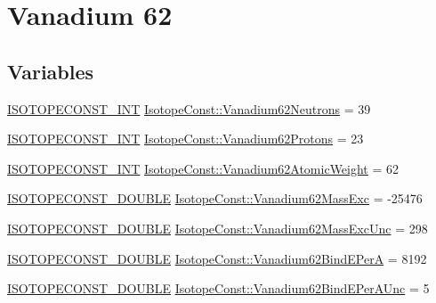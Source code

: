 \hypertarget{group___isotope_const-_vanadium-_v62}{}\section{Vanadium 62}
\label{group___isotope_const-_vanadium-_v62}
\subsection*{Variables}
\begin{DoxyCompactItemize}
\item 
\mbox{\hyperlink{group___isotope_const-_macros_ga5f18360b3e99483a35c32d789e62621c}{I\+S\+O\+T\+O\+P\+E\+C\+O\+N\+S\+T\+\_\+\+I\+NT}} \mbox{\hyperlink{group___isotope_const-_vanadium-_v62_gad43ed21a2dc1cbc2225e058b37c8a61f}{Isotope\+Const\+::\+Vanadium62\+Neutrons}} = 39
\item 
\mbox{\hyperlink{group___isotope_const-_macros_ga5f18360b3e99483a35c32d789e62621c}{I\+S\+O\+T\+O\+P\+E\+C\+O\+N\+S\+T\+\_\+\+I\+NT}} \mbox{\hyperlink{group___isotope_const-_vanadium-_v62_gae8f27ae23c41f646b58f0be22fbe4b55}{Isotope\+Const\+::\+Vanadium62\+Protons}} = 23
\item 
\mbox{\hyperlink{group___isotope_const-_macros_ga5f18360b3e99483a35c32d789e62621c}{I\+S\+O\+T\+O\+P\+E\+C\+O\+N\+S\+T\+\_\+\+I\+NT}} \mbox{\hyperlink{group___isotope_const-_vanadium-_v62_gad12f48cba044b40662072b455e52960a}{Isotope\+Const\+::\+Vanadium62\+Atomic\+Weight}} = 62
\item 
\mbox{\hyperlink{group___isotope_const-_macros_ga8f45a7272ce02c0b4c65c44636ed719a}{I\+S\+O\+T\+O\+P\+E\+C\+O\+N\+S\+T\+\_\+\+D\+O\+U\+B\+LE}} \mbox{\hyperlink{group___isotope_const-_vanadium-_v62_ga413c97d697fb0aa888dd4711de30239e}{Isotope\+Const\+::\+Vanadium62\+Mass\+Exc}} = -\/25476
\item 
\mbox{\hyperlink{group___isotope_const-_macros_ga8f45a7272ce02c0b4c65c44636ed719a}{I\+S\+O\+T\+O\+P\+E\+C\+O\+N\+S\+T\+\_\+\+D\+O\+U\+B\+LE}} \mbox{\hyperlink{group___isotope_const-_vanadium-_v62_ga6d879d455e874fb816163a0930274d02}{Isotope\+Const\+::\+Vanadium62\+Mass\+Exc\+Unc}} = 298
\item 
\mbox{\hyperlink{group___isotope_const-_macros_ga8f45a7272ce02c0b4c65c44636ed719a}{I\+S\+O\+T\+O\+P\+E\+C\+O\+N\+S\+T\+\_\+\+D\+O\+U\+B\+LE}} \mbox{\hyperlink{group___isotope_const-_vanadium-_v62_gafff8340be42e626d60418a7808d16187}{Isotope\+Const\+::\+Vanadium62\+Bind\+E\+PerA}} = 8192
\item 
\mbox{\hyperlink{group___isotope_const-_macros_ga8f45a7272ce02c0b4c65c44636ed719a}{I\+S\+O\+T\+O\+P\+E\+C\+O\+N\+S\+T\+\_\+\+D\+O\+U\+B\+LE}} \mbox{\hyperlink{group___isotope_const-_vanadium-_v62_gaa6e50e35c8041b4427d41df13a736df1}{Isotope\+Const\+::\+Vanadium62\+Bind\+E\+Per\+A\+Unc}} = 5

\end{DoxyCompactItemize}
